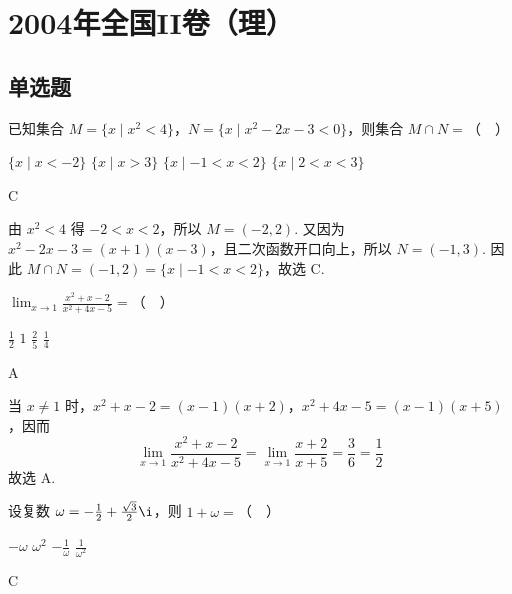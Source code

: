 \chapter{2004年全国II卷（理）}
\section{单选题}
\begin{problem}
已知集合 \(M = \{x \mid x^2 < 4\}\)，\(N = \{x \mid x^2 - 2x - 3 < 0\}\)，则集合 \(M \cap N =\)（\(\quad\)）

\choices
    {\( \{x \mid x < -2\} \)}
    {\( \{x \mid x > 3\} \)}
    {\( \{x \mid -1 < x < 2\} \)}
    {\( \{x \mid 2 < x < 3\} \)}
\end{problem}

\begin{answer}
C
\end{answer}

\begin{solution}
由 \(x^2<4\) 得 \(-2<x<2\)，所以 \(M=(-2,2)\). 又因为
\(x^2-2x-3=(x+1)(x-3)\)，且二次函数开口向上，所以 \(N=(-1,3)\). 因此
\(M\cap N=(-1,2)=\{x\mid -1<x<2\}\)，故选 C.
\end{solution}

\begin{problem}
\(\displaystyle\lim_{x\to 1}\frac{x^2 + x - 2}{x^2 + 4x - 5} =\)（\(\quad\)）

\choices
    {\( \frac{1}{2} \)}
    {\(1\)}
    {\( \frac{2}{5} \)}
    {\( \frac{1}{4} \)}
\end{problem}

\begin{answer}
A
\end{answer}

\begin{solution}
当 \(x\ne1\) 时，\(x^2+x-2=(x-1)(x+2)\)，\(x^2+4x-5=(x-1)(x+5)\)，因而
\[
\displaystyle\lim_{x\to1}\frac{x^2+x-2}{x^2+4x-5}=\lim_{x\to1}\frac{x+2}{x+5}=\frac36=\frac12
\]
故选 A.
\end{solution}

\begin{problem}
设复数 \(\omega = -\frac{1}{2} + \frac{\sqrt{3}}{2}\i\)，则 \(1 + \omega =\)（\(\quad\)）

\choices
    {\(-\omega\)}
    {\(\omega^2\)}
    {\(-\frac{1}{\omega}\)}
    {\(\frac{1}{\omega^2}\)}
\end{problem}

\begin{answer}
C
\end{answer}

